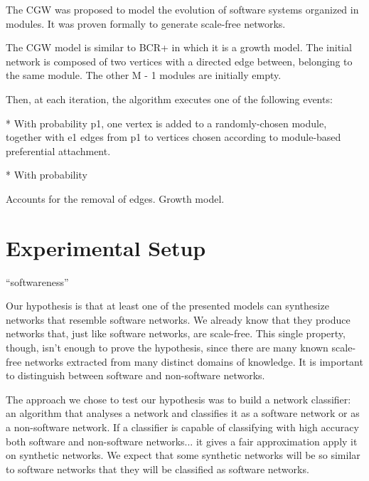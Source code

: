 The CGW was proposed to model the evolution of software systems organized in
modules. It was proven formally to generate scale-free networks.

The CGW model is similar to BCR+ in which it is a growth model. The initial
network is composed of two vertices with a directed edge between, belonging
to the same module. The other M - 1 modules are initially empty.

Then, at each iteration, the algorithm executes one of the following events:

* With probability p1, one vertex is added to a randomly-chosen module, together
with e1 edges from p1 to vertices chosen according to module-based preferential
attachment.

* With probability 

Accounts for the removal of edges. Growth model.


\section{Experimental Setup}


``softwareness''

Our hypothesis is that at least one of the presented models can synthesize
networks that resemble software networks. We already know that they produce
networks that, just like software networks, are scale-free. This single
property, though, isn't enough to prove the hypothesis, since there are many
known scale-free networks extracted from many distinct domains of knowledge. It
is important to distinguish between software and non-software networks.


The approach we chose to test our hypothesis was to build a network classifier:
an algorithm that analyses a network and classifies it as a software network or
as a non-software network. If a classifier is capable of classifying with high
accuracy both software and non-software networks...
it gives a fair approximation apply it on synthetic networks. We expect that
some synthetic networks will be so similar to software networks that they will
be classified as software networks.

